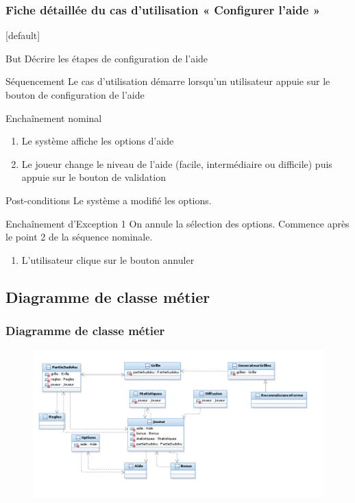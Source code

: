 \documentclass{beamer}
\begin{document}
\begin{frame}
  \frametitle{Fiche détaillée du cas d'utilisation « Configurer l’aide »}
  [default]
  \begin{block}{\footnotesize{But}}
\scriptsize{Décrire les étapes de configuration de l’aide}
  \end{block}
  \pause
  \begin{block}{\footnotesize{Séquencement}}
\scriptsize{Le cas d'utilisation démarre lorsqu’un utilisateur appuie sur le bouton de configuration de l’aide}
  \end{block}
  \pause
  \begin{block}{\footnotesize{Enchaînement nominal}}
    \begin{enumerate}    
      [circle]
    \item
      \scriptsize{Le système affiche les options d’aide}
    \item
      \scriptsize{Le joueur change le niveau de l’aide (facile, intermédiaire ou difficile) puis appuie sur le bouton de validation}
    \end{enumerate}
  \end{block}
\begin{block}{\footnotesize{Post-conditions}}
Le système a modifié les options.
\end{block}
\begin{block}{\footnotesize{Enchaînement d’Exception 1}}
\scriptsize{On annule la sélection des options. Commence après le point 2 de la séquence nominale.}
\begin{enumerate}    
  [circle]
\item
  \scriptsize{L’utilisateur clique sur le bouton annuler}
\end{enumerate}
    \end{block}
\end{frame}

\subsection{Diagramme de classe métier}
\begin{frame}
\frametitle{Diagramme de classe métier}
\begin{figure}[h]
  \includegraphics[scale=0.4]{diagrammeDeClasseMetier.png}
\end{figure}
\end{frame}

\begin{frame}
\end{frame}
\end{document}
